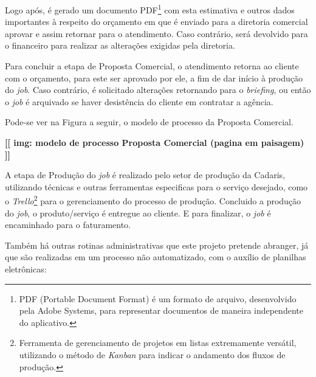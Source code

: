 \documentclass[
  12pt,				%
  openany,
  oneside,
  a4paper,			%
  english,			%
  brazil
]{article}
\numberwithin{figure}{section}
\numberwithin{table}{section}
\begin{document}
Logo após, é gerado um documento PDF\footnote{PDF (Portable Document Format) é um formato de arquivo, desenvolvido pela Adobe Systems, para representar documentos de maneira independente do aplicativo.} com esta estimativa e outros dados importantes à respeito do orçamento em que é enviado para a diretoria comercial aprovar e assim retornar para o atendimento. Caso contrário, será devolvido para o financeiro para realizar as alterações exigidas pela diretoria. 

Para concluir a etapa de Proposta Comercial, o atendimento retorna ao cliente com o orçamento, para este ser aprovado por ele, a fim de dar início à produção do \textit{job}. Caso contrário, é solicitado alterações retornando para o \textit{briefing}, ou então o \textit{job} é arquivado se haver desistência do cliente em contratar a agência.

Pode-se ver na Figura a seguir, o modelo de processo da Proposta Comercial.

\textbf{[[ img: modelo de processo Proposta Comercial (pagina em paisagem) ]]}

A etapa de Produção do \textit{job} é realizado pelo setor de produção da Cadaris, utilizando técnicas e outras ferramentas especificas para o serviço desejado, como o \textit{Trello}\footnote{Ferramenta de gerenciamento de projetos em listas extremamente versátil, utilizando o método de \textit{Kanban} para indicar o andamento dos fluxos de produção.} para o gerenciamento do processo de produção. Concluido a produção do \textit{job}, o produto/serviço é entregue ao cliente. E para finalizar, o \textit{job} é encaminhado para o faturamento. 

Também há outras rotinas administrativas que este projeto pretende abranger, já que são realizadas em um processo não automatizado, com o auxílio de planilhas eletrônicas: 
\end{document}
